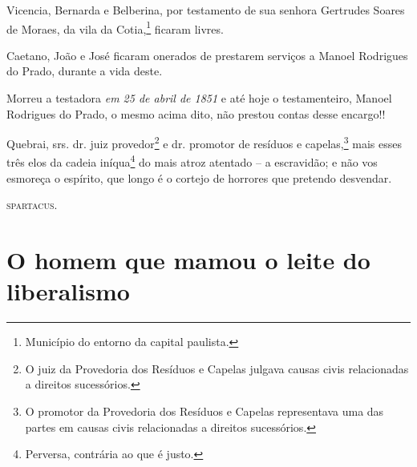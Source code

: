 {\asterisc{}

Vicencia, Bernarda e Belberina, por testamento de sua senhora Gertrudes
Soares de Moraes, da vila da Cotia,\footnote{ Município do entorno da
  capital paulista.} ficaram livres.

Caetano, João e José ficaram onerados de prestarem serviços a Manoel
Rodrigues do Prado, durante a vida deste.

Morreu a testadora \emph{em 25 de abril de 1851} e até hoje o
testamenteiro, Manoel Rodrigues do Prado, o mesmo acima dito, não
prestou contas desse encargo!!

Quebrai, srs. dr. juiz provedor\footnote{ O juiz da Provedoria dos
  Resíduos e Capelas julgava causas civis relacionadas a direitos
  sucessórios.} e dr. promotor de resíduos e capelas,\footnote{ O
  promotor da Provedoria dos Resíduos e Capelas representava uma das
  partes em causas civis relacionadas a direitos sucessórios.} mais
esses três elos da cadeia iníqua\footnote{ Perversa, contrária ao que é
  justo.} do mais atroz atentado -- a escravidão; e não vos esmoreça o
espírito, que longo é o cortejo de horrores que pretendo desvendar.
\begin{flushright}
\textsc{spartacus}.
\end{flushright}

\part{O homem que mamou o leite do liberalismo}

}
